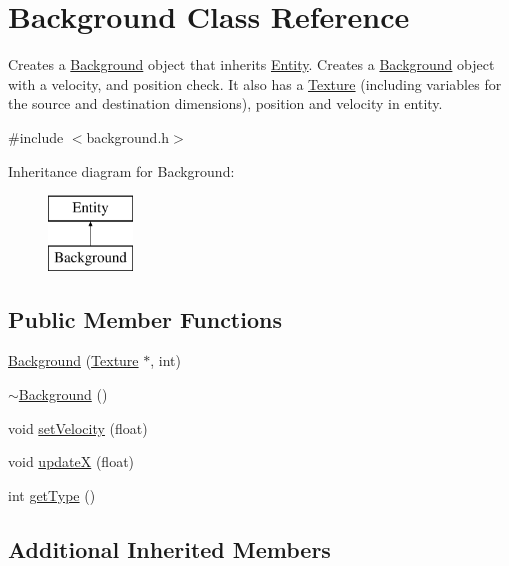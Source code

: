 \hypertarget{class_background}{\section{Background Class Reference}
\label{class_background}
}


Creates a \hyperlink{class_background}{Background} object that inherits \hyperlink{class_entity}{Entity}. Creates a \hyperlink{class_background}{Background} object with a velocity, and position check. It also has a \hyperlink{class_texture}{Texture} (including variables for the source and destination dimensions), position and velocity in entity.  




{\ttfamily \#include $<$background.\+h$>$}

Inheritance diagram for Background\+:\begin{figure}[H]
\begin{center}
\leavevmode
\includegraphics[height=2.000000cm]{class_background}
\end{center}
\end{figure}
\subsection*{Public Member Functions}
\begin{DoxyCompactItemize}
\item 
\hyperlink{class_background_a31d67c19cf5dd14c0f07b91e89c8b1f8}{Background} (\hyperlink{class_texture}{Texture} $\ast$, int)
\item 
\hyperlink{class_background_a36754df1deb720393217ade59da41557}{$\sim$\+Background} ()
\item 
void \hyperlink{class_background_a9b358e049be63be31b9241410288514f}{set\+Velocity} (float)
\item 
void \hyperlink{class_background_a1cb5afc5d8857ec4db6c6d393375a4c2}{update\+X} (float)
\item 
int \hyperlink{class_background_a25e0286050106340c34d91d3f1d0f4df}{get\+Type} ()
\end{DoxyCompactItemize}
\subsection*{Additional Inherited Members}


